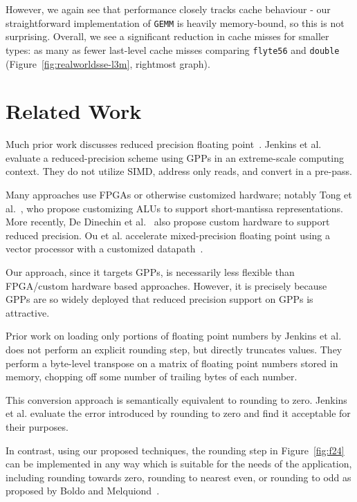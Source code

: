 \documentclass{sig-alternate-05-2015}
\begin{document}
However, we again see that performance closely tracks cache behaviour - our
straightforward implementation of \texttt{GEMM} is heavily memory-bound, so
this is not surprising. Overall, we see a significant reduction in cache misses
for smaller types: as many as  fewer last-level cache misses
comparing \texttt{flyte56} and \texttt{double}
(Figure~\ref{fig:realworldsse-l3m}, rightmost graph).


\section{Related Work}
\label{sec:related}

Much prior work discusses reduced precision floating
point~\cite{rubio2013precimonious,lam2013automatically,buttari2006exploiting}.
Jenkins et al.~\cite{jenkins2012byte} evaluate a reduced-precision scheme using
GPPs in an extreme-scale computing context. They do not utilize SIMD, address
only reads, and convert in a pre-pass.

Many approaches use FPGAs or otherwise customized hardware; notably Tong et
al.~\cite{tong2000reducing}, who propose customizing ALUs to support
short-mantissa representations. More recently, De Dinechin et
al.~\cite{de2009generating} also propose custom hardware to support reduced
precision. Ou et al. accelerate mixed-precision floating point using a vector
processor with a customized datapath~\cite{ou2015mixed}.

Our approach, since it targets GPPs, is necessarily less flexible than
FPGA/custom hardware based approaches. However, it is precisely because GPPs
are so widely deployed that reduced precision support on GPPs is attractive.

Prior work on loading only portions of floating point numbers by Jenkins et
al.~\cite{jenkins2012byte} does not perform an explicit rounding step, but
directly truncates values. They perform a byte-level transpose on a matrix of
floating point numbers stored in memory, chopping off some number of trailing
bytes of each number.

This conversion approach is semantically equivalent to rounding to zero.
Jenkins et al. evaluate the error introduced by rounding to zero and find it
acceptable for their purposes.

In contrast, using our proposed techniques, the rounding step in
Figure~\ref{fig:f24} can be implemented in any way which is suitable for the
needs of the application, including rounding towards zero, rounding to nearest
even, or rounding to odd as proposed by Boldo and
Melquiond~\cite{boldo2004double}.
\end{document}
